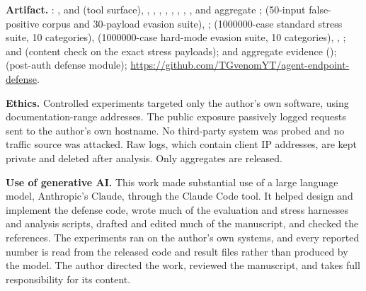 \documentclass[10pt,twocolumn]{article}
\begin{document}
\smallskip\noindent\textbf{Artifact.} : ,
 and  (tool surface), , ,
, , , ,
, , and aggregate ;
 (50-input false-positive corpus and 30-payload evasion suite),
;
 (\num{1000000}-case standard stress suite, 10 categories),
 (\num{1000000}-case hard-mode evasion suite, 10 categories),
, ;
 and 
(content check on the exact stress payloads);
 and aggregate \mirage{} evidence
();
 (post-auth defense module);
\url{https://github.com/TGvenomYT/agent-endpoint-defense}.

\smallskip\noindent\textbf{Ethics.} Controlled experiments targeted only the
author's own software, using documentation-range addresses. The public
exposure passively logged requests sent to the author's own hostname. No
third-party system was probed and no traffic source was attacked. Raw logs,
which contain client IP addresses, are kept private and deleted after
analysis. Only aggregates are released.

\smallskip\noindent\textbf{Use of generative AI.} This work made substantial
use of a large language model, Anthropic's Claude, through the Claude Code
tool. It helped design and implement the defense code, wrote much of the
evaluation and stress harnesses and analysis scripts, drafted and edited much
of the manuscript, and checked the references. The experiments ran on the
author's own systems, and every reported number is read from the released code
and result files rather than produced by the model. The author directed the
work, reviewed the manuscript, and takes full responsibility for its content.

\balance
\small


\end{document}

